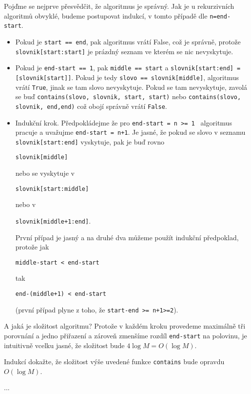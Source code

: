 Pojďme se nejprve přesvědčit, že algoritmus je správný. Jak je u rekurzivních algoritmů obvyklé, budeme postupovat indukcí, v tomto případě dle {\tt n=end-start}.
\begin{itemize}
 \item[{\tt n=0}] Pokud je {\tt start == end}, pak algoritmus vrátí False, což je správně, protože {\tt slovnik[start:start]} je prázdný seznam ve kterém se nic nevyskytuje.
 \item[{\tt n=1}] Pokud je {\tt end-start == 1}, pak {\tt middle == start} a {\tt slovnik[start:end] = [slovnik[start]]}. Pokud je tedy {\tt slovo == slovnik[middle]}, algoritmus
vrátí {\tt True}, jinak se tam slovo nevyskytuje. Pokud se tam nevyskytuje, zavolá se buď {\tt contains(slovo, slovnik, start, start)} nebo {\tt contains(slovo, slovnik, end,end)} což obojí
správně vrátí {\tt False}.
 \item[{\tt n+1}] Indukční krok. Předpokládejme že pro {\tt end-start = n >= 1 } algoritmus pracuje a uvažujme {\tt end-start = n+1}. Je jasné, že
pokud se slovo v seznamu {\tt slovnik[start:end]} vyskytuje, pak je buď rovno
\begin{center}
{\tt slovnik[middle]}
\end{center}
nebo se vyskytuje v
\begin{center}
{\tt slovnik[start:middle]}
\end{center}
nebo v
\begin{center}
{\tt slovnik[middle+1:end]}.
\end{center}
První případ je jasný a na druhé dva můžeme použít indukční předpoklad, protože jak
\begin{center}
{\tt middle-start < end-start}
\end{center}
tak
\begin{center}
{\tt end-(middle+1) < end-start}
\end{center}
(první případ plyne z toho, že {\tt start-end >= n+1>=2}).
\end{itemize}

A jaká je složitost algoritmu? Protože v každém kroku provedeme maximálně tři porovnání a jedno přiřazení a zároveň zmenšíme rozdíl {\tt end-start} na polovinu,
je intuitivně vcelku jasné, že složitost bude $4\log M = O(\log M)$.

\begin{cviceni} Indukcí dokažte, že složitost výše uvedené funkce {\tt contains} bude opravdu $O(\log M)$.
\end{cviceni}
\begin{reseni} ...
\end{reseni}

